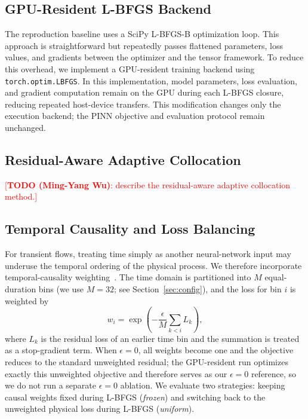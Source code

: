 \documentclass{article}
\begin{document}
\subsection{GPU-Resident L-BFGS Backend}

The reproduction baseline uses a SciPy L-BFGS-B optimization loop. This approach is straightforward but repeatedly passes flattened parameters, loss values, and gradients between the optimizer and the tensor framework. To reduce this overhead, we implement a GPU-resident training backend using \texttt{torch.optim.LBFGS}. In this implementation, model parameters, loss evaluation, and gradient computation remain on the GPU during each L-BFGS closure, reducing repeated host-device transfers. This modification changes only the execution backend; the PINN objective and evaluation protocol remain unchanged.

\subsection{Residual-Aware Adaptive Collocation}

\textcolor{red}{[\textbf{TODO (Ming-Yang Wu)}: describe the residual-aware adaptive collocation method.]}

\subsection{Temporal Causality and Loss Balancing}

For transient flows, treating time simply as another neural-network input may underuse the temporal ordering of the physical process. We therefore incorporate temporal-causality weighting~\cite{wang2024causal}. The time domain is partitioned into $M$ equal-duration bins (we use $M=32$; see Section~\ref{sec:config}), and the loss for bin $i$ is weighted by
\begin{equation}
    w_i = \exp\left(-\frac{\epsilon}{M}\sum_{k<i}L_k\right),
\end{equation}
where $L_k$ is the residual loss of an earlier time bin and the summation is treated as a stop-gradient term. When $\epsilon=0$, all weights become one and the objective reduces to the standard unweighted residual; the GPU-resident run optimizes exactly this unweighted objective and therefore serves as our $\epsilon=0$ reference, so we do not run a separate $\epsilon=0$ ablation. We evaluate two strategies: keeping causal weights fixed during L-BFGS (\emph{frozen}) and switching back to the unweighted physical loss during L-BFGS (\emph{uniform}).
\end{document}
